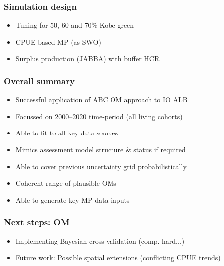 \documentclass{beamer}
\begin{document}
\begin{frame}
    \frametitle{Simulation design}
\begin{itemize}
    \item Tuning for 50, 60 and 70$\%$ Kobe green
    \item CPUE-based MP (as SWO)
    \item Surplus production (JABBA) with buffer HCR
\end{itemize}
\end{frame}

\begin{frame}
    \frametitle{Overall summary}
\begin{itemize}
    \item Successful application of ABC OM approach to IO ALB 
    \item Focussed on 2000--2020 time-period (all living cohorts)
    \item Able to fit to all key data sources
    \item Mimics assessment model structure \& status if required
    \item Able to cover previous uncertainty grid probabilistically
    \item Coherent range of plausible OMs
    \item Able to generate key MP data inputs
\end{itemize}
\end{frame}

\begin{frame}
    \frametitle{Next steps: OM}
\begin{itemize}
    \item Implementing Bayesian cross-validation (comp. hard...)
    \item Future work: Possible spatial extensions (conflicting CPUE trends)
\end{itemize}
\end{frame}
\end{document}
